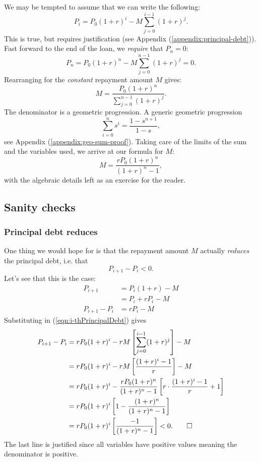 \documentclass[]{scrartcl}
\theoremstyle{definition}
\let\oldref\ref
\renewcommand{\ref}[1]{(\oldref{#1})}
\begin{document}
We may be tempted to assume that we can write the following:
\begin{equation}\label{eqn:i-thPrincipalDebt}
    P_i = P_0(1+r)^i - M\sum_{j=0}^{i-1}(1+r)^j.
\end{equation}
This is true, but requires justification (see Appendix \ref{appendix:principal-debt}). Fast forward to the end of the loan, we \textit{require} that $P_n = 0$:
\[
    P_n = P_0(1+r)^n - M\sum_{j=0}^{n-1}(1+r)^j = 0.
\]
Rearranging for the \textit{constant} repayment amount $M$ gives:
\[
    M = \frac{P_0(1+r)^n}{\sum_{j=0}^{n-1}(1+r)^j}.
\]
The denominator is a geometric progression. A generic geometric progression 
\[
    \sum_{i=0}^{n}s^i = \frac{1 - s^{n+1}}{1 - s},
\]
see Appendix \ref{appendix:geo-sum-proof}. Taking care of the limits of the sum and the variables used, we arrive at our formula for $M$:
\begin{equation}\label{eqn:amortisation}
    M = \frac{rP_0(1+r)^n}{(1+r)^n - 1},
\end{equation}
with the algebraic details left as an exercise for the reader.

\subsection{Sanity checks}

\subsubsection{Principal debt reduces}
One thing we would hope for is that the repayment amount $M$ actually \textit{reduces} the principal debt, i.e. that 
\[
    P_{i+1} - P_i < 0.
\]
Let's see that this is the case:
\begin{align*}
    P_{i+1} &= P_i(1 + r) - M \\
            &= P_i + rP_i - M \\
    P_{i+1} - P_i &= rP_i - M
\end{align*}
Substituting in \ref{eqn:i-thPrincipalDebt} gives
\begin{align*}
    P_{i+1} - P_i &= rP_0(1+r)^i - rM\left[\sum_{j=0}^{i-1}(1+r)^j\right] - M \\
    &= rP_0(1+r)^i - rM\left[\frac{(1+r)^i - 1}{r}\right] - M \\
    &= rP_0(1+r)^i - \frac{rP_0(1+r)^n}{(1+r)^n - 1}\left[r\cdot\frac{(1+r)^i - 1}{r} + 1\right] \\
    &= rP_0(1+r)^i\left[1 - \frac{(1+r)^n}{(1+r)^n-1}\right]\\
    &= rP_0(1+r)^i\left[\frac{-1}{(1+r)^n-1}\right] < 0. \qed
\end{align*}
The last line is justified since all variables have positive values meaning the denominator is positive.
\end{document}
